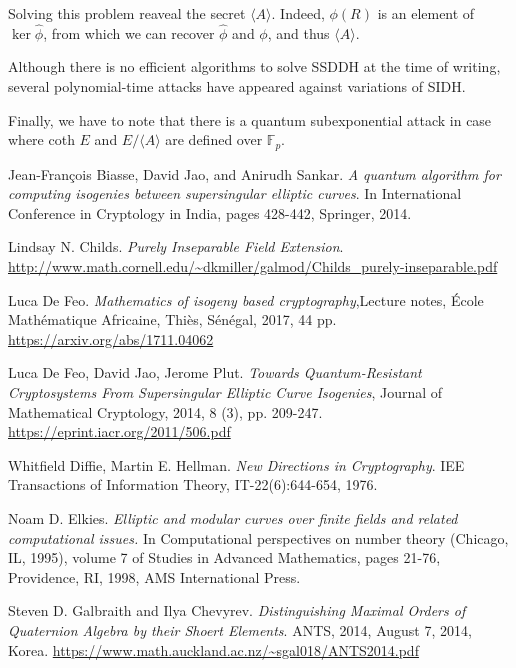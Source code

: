 \documentclass{article}
\theoremstyle{theorem}
\theoremstyle{definition}
\begin{document}
Solving this problem reaveal the secret $\langle A \rangle$. Indeed, $\phi(R)$ is an element of $\ker\hat{\phi}$, from which we can recover $\hat{\phi}$ and $\phi$, and thus $\langle A \rangle$. 

Although there is no efficient algorithms to solve SSDDH at the time of writing, several polynomial-time attacks have appeared  against variations of SIDH.

Finally, we have to note that there is a quantum subexponential attack \cite{IsogeniesSSEC} in case where coth $E$ and $E/\langle A \rangle$ are defined over $\mathbb{F}_p$.

\newpage
\begin{thebibliography}{}
	 Jean-François Biasse, David Jao, and Anirudh Sankar. \textit{A quantum algorithm for computing isogenies between supersingular elliptic curves}. In International Conference in Cryptology in India, pages 428-442, Springer, 2014.
	
	 Lindsay N. Childs. \textit{Purely Inseparable Field Extension}. \url{http://www.math.cornell.edu/~dkmiller/galmod/Childs_purely-inseparable.pdf}
	
	 Luca De Feo. \textit{Mathematics of isogeny based cryptography},Lecture notes, École Mathématique Africaine, Thiès, Sénégal, 2017, 44 pp. \url{https://arxiv.org/abs/1711.04062}
	
	 Luca De Feo, David Jao, Jerome Plut. \textit{Towards Quantum-Resistant Cryptosystems From Supersingular Elliptic Curve Isogenies}, Journal of Mathematical Cryptology, 2014, 8 (3), pp. 209-247. \url{https://eprint.iacr.org/2011/506.pdf}
	
	 Whitfield Diffie, Martin E. Hellman. \textit{New Directions in Cryptography}. IEE Transactions of Information Theory, IT-22(6):644-654, 1976.
	
	 Noam D. Elkies. \textit{Elliptic and modular curves over finite fields and related computational issues.} In Computational perspectives on number theory (Chicago, IL, 1995), volume 7 of Studies in Advanced Mathematics, pages 21-76, Providence, RI, 1998, AMS International Press.
	
	 Steven D. Galbraith and Ilya Chevyrev. \textit{Distinguishing Maximal Orders of Quaternion Algebra by their Shoert Elements}. ANTS, 2014, August 7, 2014, Korea. \url{https://www.math.auckland.ac.nz/~sgal018/ANTS2014.pdf}
	

\end{thebibliography}
\end{document}

